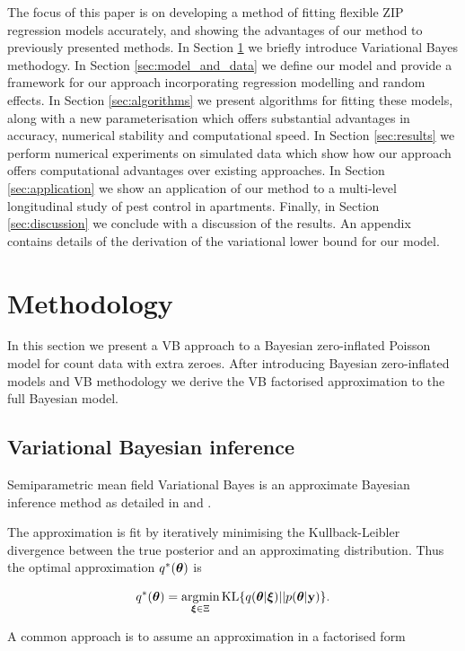 \documentclass{article}[12pt]
\begin{document}
The focus of this paper is on developing a method of fitting flexible ZIP regression models accurately, and
showing the advantages of our method to previously presented methods. In Section \ref{sec:methodology} we
briefly introduce Variational Bayes methodogy. In Section \ref{sec:model_and_data} we define our model and
provide a framework for our approach incorporating regression modelling and random effects. In Section
\ref{sec:algorithms} we present algorithms for fitting these models, along with a new parameterisation which
offers substantial advantages in accuracy, numerical stability and computational speed. In Section
\ref{sec:results} we perform numerical experiments on simulated data which show how our approach offers
computational advantages over existing approaches. In Section \ref{sec:application} we show an application of
our method to a multi-level longitudinal study of pest control in apartments. Finally, in Section
\ref{sec:discussion} we conclude with a discussion of the results. An appendix contains details of the
derivation of the variational lower bound for our model.

\section{Methodology}
\label{sec:methodology}

In this section we present a VB approach to a Bayesian zero-inflated Poisson model for count data with extra
zeroes. After introducing Bayesian zero-inflated models and VB methodology we derive the VB factorised
approximation to the full Bayesian model.

\subsection{Variational Bayesian inference}

Semiparametric mean field Variational Bayes is an approximate Bayesian inference method as detailed in
\cite{ormerod10} and \cite{RohdeWand2015}.

The approximation is fit by iteratively minimising the Kullback-Leibler divergence between the true posterior
and an approximating distribution. Thus the optimal approximation $q^*({\boldsymbol \theta})$ is

$$
q^*(\vtheta) = \argmin_{\vxi \in \Xi} \text{KL} \{ {q(\vtheta|\vxi) || p(\vtheta|\vy)} \}.
$$

A common approach is to assume an approximation in a factorised form
\end{document}
